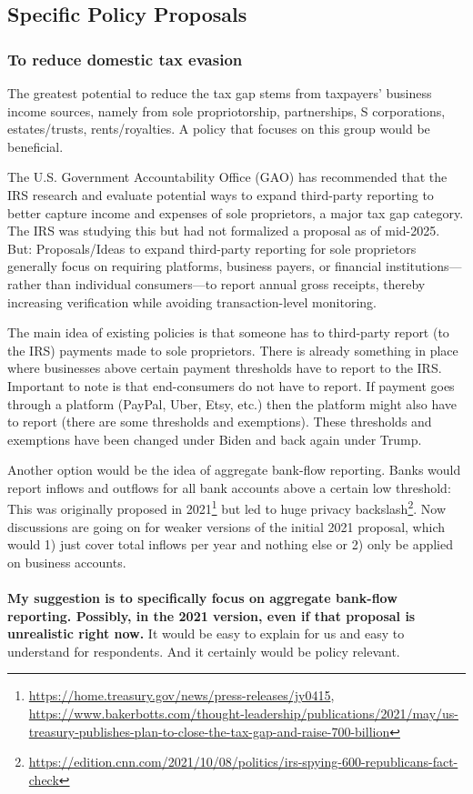 \documentclass[12pt]{article}
\begin{document}
\subsection{Specific Policy Proposals}
\subsubsection{To reduce domestic tax evasion}
The greatest potential to reduce the tax gap stems from taxpayers' business income sources, namely from sole propriotorship, partnerships, S corporations, estates/trusts, rents/royalties. A policy that focuses on this group would be beneficial.

The U.S. Government Accountability Office (GAO) has recommended that the IRS research and evaluate potential ways to expand third-party reporting to better capture income and expenses of sole proprietors, a major tax gap category. The IRS was studying this but had not formalized a proposal as of mid-2025. But: Proposals/Ideas to expand third-party reporting for sole proprietors generally focus on requiring platforms, business payers, or financial institutions—rather than individual consumers—to report annual gross receipts, thereby increasing verification while avoiding transaction-level monitoring.

The main idea of existing policies is that someone has to third-party report (to the IRS) payments made to sole proprietors. There is already something in place where businesses above certain payment thresholds have to report to the IRS. Important to note is that end-consumers do not have to report. If payment goes through a platform (PayPal, Uber, Etsy, etc.) then the platform might also have to report (there are some thresholds and exemptions). These thresholds and exemptions have been changed under Biden and back again under Trump. 

Another option would be the idea of aggregate bank-flow reporting. Banks would report inflows and outflows for all bank accounts above a certain low threshold: This was originally proposed in 2021\footnote{\url{https://home.treasury.gov/news/press-releases/jy0415}, \url{https://www.bakerbotts.com/thought-leadership/publications/2021/may/us-treasury-publishes-plan-to-close-the-tax-gap-and-raise-700-billion}} but led to huge privacy backslash\footnote{\url{https://edition.cnn.com/2021/10/08/politics/irs-spying-600-republicans-fact-check}}. Now discussions are going on for weaker versions of the initial 2021 proposal, which would 1) just cover total inflows per year and nothing else or 2) only be applied on business accounts. 
\\ \\
\noindent \textbf{My suggestion is to specifically focus on aggregate bank-flow reporting. Possibly, in the 2021 version, even if that proposal is unrealistic right now.} It would be easy to explain for us and easy to understand for respondents. And it certainly would be policy relevant.
\end{document}
